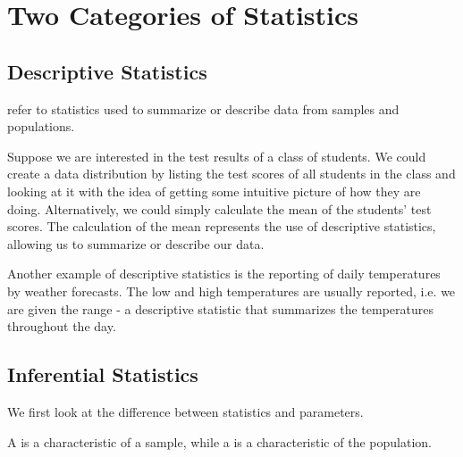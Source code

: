 \section{Two Categories of Statistics}

\subsection{Descriptive Statistics}

\begin{definition}
     refer to statistics used to summarize or describe data from samples and populations.
\end{definition}

\begin{example}
    Suppose we are interested in the test results of a class of students. We could create a data distribution by listing the test scores of all students in the class and looking at it with the idea of getting some intuitive picture of how they are doing. Alternatively, we could simply calculate the mean of the students' test scores. The calculation of the mean represents the use of descriptive statistics, allowing us to summarize or describe our data.

    Another example of descriptive statistics is the reporting of daily temperatures by weather forecasts. The low and high temperatures are usually reported, i.e. we are given the range - a descriptive statistic that summarizes the temperatures throughout the day.
\end{example}

\subsection{Inferential Statistics}

We first look at the difference between statistics and parameters.

\begin{definition}
    A  is a characteristic of a sample, while a  is a characteristic of the population.
\end{definition}
